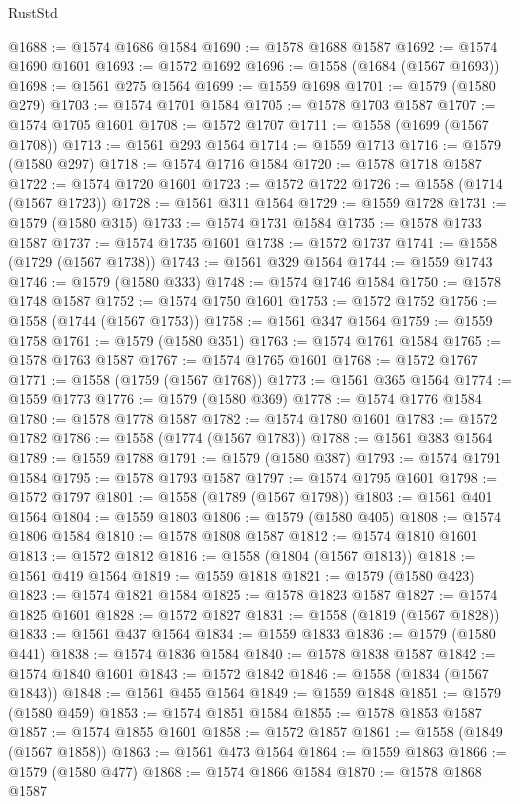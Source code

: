 \begin{lexlean}{RustStd}
\begin{coremodule}
@1688 := @1574 @1686 @1584
@1690 := @1578 @1688 @1587
@1692 := @1574 @1690 @1601
@1693 := @1572 @1692
@1696 := @1558 (@1684 (@1567 @1693))
@1698 := @1561 @275 @1564
@1699 := @1559 @1698
@1701 := @1579 (@1580 @279)
@1703 := @1574 @1701 @1584
@1705 := @1578 @1703 @1587
@1707 := @1574 @1705 @1601
@1708 := @1572 @1707
@1711 := @1558 (@1699 (@1567 @1708))
@1713 := @1561 @293 @1564
@1714 := @1559 @1713
@1716 := @1579 (@1580 @297)
@1718 := @1574 @1716 @1584
@1720 := @1578 @1718 @1587
@1722 := @1574 @1720 @1601
@1723 := @1572 @1722
@1726 := @1558 (@1714 (@1567 @1723))
@1728 := @1561 @311 @1564
@1729 := @1559 @1728
@1731 := @1579 (@1580 @315)
@1733 := @1574 @1731 @1584
@1735 := @1578 @1733 @1587
@1737 := @1574 @1735 @1601
@1738 := @1572 @1737
@1741 := @1558 (@1729 (@1567 @1738))
@1743 := @1561 @329 @1564
@1744 := @1559 @1743
@1746 := @1579 (@1580 @333)
@1748 := @1574 @1746 @1584
@1750 := @1578 @1748 @1587
@1752 := @1574 @1750 @1601
@1753 := @1572 @1752
@1756 := @1558 (@1744 (@1567 @1753))
@1758 := @1561 @347 @1564
@1759 := @1559 @1758
@1761 := @1579 (@1580 @351)
@1763 := @1574 @1761 @1584
@1765 := @1578 @1763 @1587
@1767 := @1574 @1765 @1601
@1768 := @1572 @1767
@1771 := @1558 (@1759 (@1567 @1768))
@1773 := @1561 @365 @1564
@1774 := @1559 @1773
@1776 := @1579 (@1580 @369)
@1778 := @1574 @1776 @1584
@1780 := @1578 @1778 @1587
@1782 := @1574 @1780 @1601
@1783 := @1572 @1782
@1786 := @1558 (@1774 (@1567 @1783))
@1788 := @1561 @383 @1564
@1789 := @1559 @1788
@1791 := @1579 (@1580 @387)
@1793 := @1574 @1791 @1584
@1795 := @1578 @1793 @1587
@1797 := @1574 @1795 @1601
@1798 := @1572 @1797
@1801 := @1558 (@1789 (@1567 @1798))
@1803 := @1561 @401 @1564
@1804 := @1559 @1803
@1806 := @1579 (@1580 @405)
@1808 := @1574 @1806 @1584
@1810 := @1578 @1808 @1587
@1812 := @1574 @1810 @1601
@1813 := @1572 @1812
@1816 := @1558 (@1804 (@1567 @1813))
@1818 := @1561 @419 @1564
@1819 := @1559 @1818
@1821 := @1579 (@1580 @423)
@1823 := @1574 @1821 @1584
@1825 := @1578 @1823 @1587
@1827 := @1574 @1825 @1601
@1828 := @1572 @1827
@1831 := @1558 (@1819 (@1567 @1828))
@1833 := @1561 @437 @1564
@1834 := @1559 @1833
@1836 := @1579 (@1580 @441)
@1838 := @1574 @1836 @1584
@1840 := @1578 @1838 @1587
@1842 := @1574 @1840 @1601
@1843 := @1572 @1842
@1846 := @1558 (@1834 (@1567 @1843))
@1848 := @1561 @455 @1564
@1849 := @1559 @1848
@1851 := @1579 (@1580 @459)
@1853 := @1574 @1851 @1584
@1855 := @1578 @1853 @1587
@1857 := @1574 @1855 @1601
@1858 := @1572 @1857
@1861 := @1558 (@1849 (@1567 @1858))
@1863 := @1561 @473 @1564
@1864 := @1559 @1863
@1866 := @1579 (@1580 @477)
@1868 := @1574 @1866 @1584
@1870 := @1578 @1868 @1587

\end{coremodule}
\end{lexlean}
